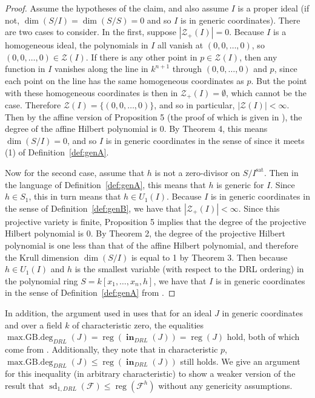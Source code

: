 \documentclass[11pt]{article}
\newcommand{\F}{\mathcal{F}}
\newcommand{\sat}{^{\text{sat}}}
\DeclareMathOperator{\Init}{\mathbf{in}}
\DeclareMathOperator{\sd}{sd}
\DeclareMathOperator{\reg}{reg}
\DeclareMathOperator{\mdeg}{max.GB.deg}
\theoremstyle{definition}
\begin{document}
\begin{proof}
	Assume the hypotheses of the claim, and also assume $I$ is a proper ideal (if not, $\dim(S/I) = \dim(S/S) = 0$ and so $I$ is in generic coordinates). There are two cases to consider. In the first, suppose $|\mathcal{Z}_+(I)| = 0$. Because $I$ is a homogeneous ideal, the polynomials in $I$ all vanish at $(0,0, \dots, 0)$, so $(0,0,\dots,0) \in \mathcal{Z}(I)$. If there is any other point in $p \in \mathcal{Z}(I)$, then any function in $I$ vanishes along the line in $k^{n+1}$ through $(0,0,\dots,0)$ and $p$, since each point on the line has the same homogeneous coordinates as $p$. But the point with these homogeneous coordinates is then in $\mathcal{Z}_+(I) = \emptyset$, which cannot be the case. Therefore $\mathcal{Z}(I) = \{(0,0,\dots,0)\}$, and so in particular, $|\mathcal{Z}(I)| < \infty$. Then by the affine version of Proposition 5 (the proof of which is given in \cite{cox2013ideals}), the degree of the affine Hilbert polynomial is 0. By Theorem 4, this means $\dim(S/I) = 0$, and so $I$ is in generic coordinates in the sense of \cite{bayer1987criterion} since it meets (1) of Definition~\ref{def:genA}. 

	Now for the second case, assume that $h$ is not a zero-divisor on $S/I\sat$. Then in the language of Definition~\ref{def:genA}, this means that $h$ is generic for $I$. Since $h \in S_1$, this in turn means that $h \in U_1(I)$. Because $I$ is in generic coordinates in the sense of Definition~\ref{def:genB}, we have that $|\mathcal{Z}_+(I)| < \infty$. Since this projective variety is finite, Proposition 5 implies that the degree of the projective Hilbert polynomial is 0. By Theorem 2, the degree of the projective Hilbert polynomial is one less than that of the affine Hilbert polynomial, and therefore the Krull dimension $\dim(S/I)$ is equal to 1 by Theorem 3. Then because $h \in U_1(I)$ and $h$ is the smallest variable (with respect to the DRL ordering) in the polynomial ring $S = k[x_1, \dots, x_n, h]$, we have that $I$ is in generic coordinates in the sense of Definition~\ref{def:genA} from \cite{bayer1987criterion}. 
\end{proof}


In addition, the argument used in \cite{caminata2020solving} uses that for an ideal $J$ in generic coordinates and over a field $k$ of characteristic zero, the equalities $\mdeg_{DRL}(J) = \reg(\Init_{DRL}(J)) = \reg(J)$ hold, both of which come from \cite{bayer1987criterion}. Additionally, they note that in characteristic $p$, $\mdeg_{DRL}(J) \leq \reg(\Init_{DRL}(J))$ still holds. We give an argument for this inequality (in arbitrary characteristic) to show a weaker version of the result that $\sd_{1,DRL}(\F) \leq \reg(\F^h)$ without any genericity assumptions. 
\end{document}
